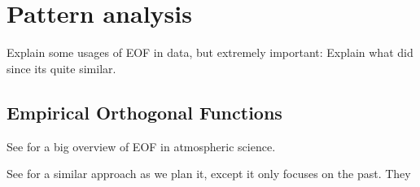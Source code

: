 \section{Pattern analysis}

Explain some usages of EOF in data, but extremely important: Explain what \cite{ayantobo_integrated_2022} did since its quite similar. 

\subsection{Empirical Orthogonal Functions}

See \cite{hannachi_empirical_2007} for a big overview of EOF in atmospheric science.

See \cite{ayantobo_integrated_2022} for a similar approach as we plan it, except it only focuses on the past.
They 
